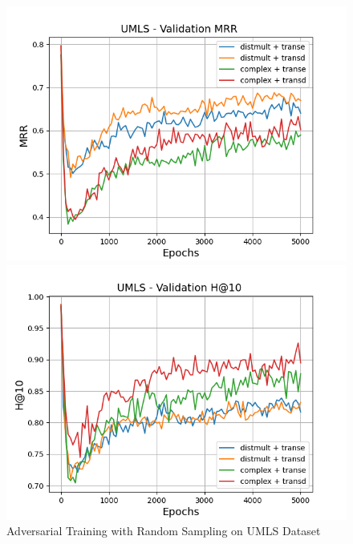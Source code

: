 \begin{figure}
\begin{minipage}{.5\textwidth}
    \end{minipage}
    \begin{minipage}{.5\textwidth}
      \centering
      \includegraphics[width=0.9\linewidth]{figures/results/gan_train/pretrained/random/umls/gan_train_random_umls_mrrs.png}
    \end{minipage}%
    \begin{minipage}{.5\textwidth}
      \centering
      \includegraphics[width=0.9\linewidth]{figures/results/gan_train/pretrained/random/umls/gan_train_random_umls_hit10s.png}
    \end{minipage}%
    \caption{Adversarial Training with Random Sampling on \textsc{UMLS} Dataset}
    \label{fig:test}
\end{figure}

\pagebreak

